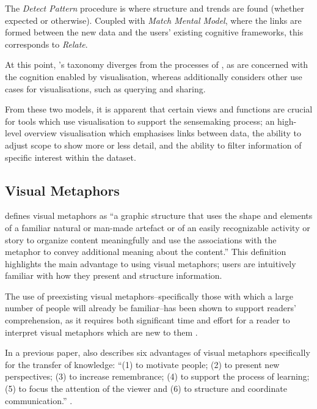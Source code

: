 The \textit{Detect Pattern} procedure is where structure and trends are found (whether expected or otherwise). Coupled with \textit{Match Mental Model}, where the links are formed between the new data and the users' existing cognitive frameworks, this corresponds to \textit{Relate}.

At this point, \citeauthor{TheEyesHaveIt}'s taxonomy diverges from the processes of \citep{UnderstandingAndCharacterizingInsights}, as \citeauthor{UnderstandingAndCharacterizingInsights} are concerned with the cognition enabled by visualisation, whereas  \citeauthor{TheEyesHaveIt} additionally considers other use cases for visualisations, such as querying and sharing.

From these two models, it is apparent that certain views and functions are crucial for tools which use visualisation to support the sensemaking process; an high-level overview visualisation which emphasises links between data, the ability to adjust scope to show more or less detail, and the ability to filter information of specific interest within the dataset.

\subsection{Visual Metaphors}

\citeauthor{AComparisonBetweenConceptMaps} defines visual metaphors as ``a graphic structure that uses the shape and elements of a familiar natural or man-made artefact or of an easily recognizable activity or story to organize content meaningfully and use the associations with the metaphor to convey additional meaning about the content.'' \citep[p.203]{AComparisonBetweenConceptMaps} This definition highlights the main advantage to using visual metaphors; users are intuitively familiar with how they present and structure information.

The use of preexisting visual metaphors--specifically those with which a large number of people will already be familiar--has been shown to support readers' comprehension, as it requires both significant time and effort for a reader to interpret visual metaphors which are new to them \citep{PreconceptionsVisualMetaphors}.

In a previous paper, \citeauthor{VisuelleKommunikation} also describes six advantages of visual metaphors specifically for the transfer of knowledge: ``(1) to motivate people; (2) to present new perspectives; (3) to increase remembrance; (4) to support the process of learning; (5) to focus the attention of the viewer and (6) to structure and coordinate communication.'' \citep[p.2, citing \citep{VisuelleKommunikation}]{LearningFromArchitects}.


